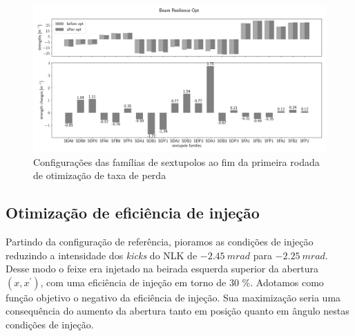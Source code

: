 \documentclass[a4paper,
               keeplastbox,   %
               ]{jacow}
\begin{document}
\begin{figure}[t]
    \centering
    \includegraphics*[width=\textwidth]{beam_loss_sexts.png}
    \caption{Configurações das famílias de sextupolos ao fim da primeira rodada de otimização de taxa de perda}
    \label{beam_loss_sexts}
\end{figure}


\subsection{Otimização de eficiência de injeção}
Partindo da configuração de referência, pioramos as condições de injeção reduzindo a intensidade dos \textit{kicks} do NLK de $-2.45~\unit{m rad}$ para $-2.25~\unit{m rad}$. Desse modo o feixe era injetado na beirada esquerda superior da abertura $(x,x^\prime)$, com uma eficiência de injeção em torno de 30 \%. Adotamos como função objetivo o negativo da eficiência de injeção. Sua maximização seria uma consequência do aumento da abertura tanto em posição quanto em ângulo nestas condições de injeção. 
\end{document}

